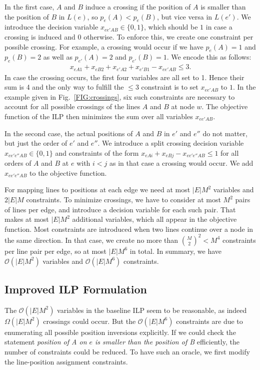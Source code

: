 \documentclass[sigconf]{acmart}
\begin{document}
In the first case, $A$ and $B$ induce a crossing if the position of $A$ is smaller than the position of $B$ in $L(e)$, so $p_e(A) < p_e(B)$, but vice versa in $L(e')$. We introduce the decision variable $x_{ee'AB} \in \{0,1\}$, which should be $1$ in case a crossing is induced and $0$ otherwise. To enforce this, we create one constraint per possible crossing. For example, a crossing would occur if we have $p_e(A)=1$ and $p_e(B)=2$ as well as $p_{e'}(A)=2$ and $p_{e'}(B) =1$. We encode this as follows:
\begin{align}
	x_{eA1} + x_{eB2} + x_{e'A2} + x_{e'B1} - x_{ee'AB} \leq 3  \label{EQ:crossdec_constr_bl}.
\end{align}
In case the crossing occurs, the first four variables are all set to 1. Hence their sum is 4 and the only way to fulfill the $\leq 3$ constraint is to set $x_{ee'AB}$ to $1$. In the example given in Fig.~\ref{FIG:crossings}, six such constraints are necessary to account for all possible crossings of the lines $A$ and $B$ at node $w$.
The objective function of the ILP then minimizes the sum over all variables $x_{ee'AB}$.

In the second case, the actual positions of $A$ and $B$ in $e'$ and $e''$ do not matter, but just the order of $e'$ and $e''$. We introduce a split crossing decision variable $x_{ee'e''AB} \in \{0,1\}$ and constraints of the form $x_{eAi} + x_{eBj} - x_{ee'e''AB} \leq 1$ for all orders of $A$ and $B$ at $e$ with $i < j$ as in that case a crossing would occur.
We add $x_{ee'e''AB}$ to the objective function.

For mapping lines to positions at each edge we need at most $|E|M^{2}$ variables and $2|E|M$ constraints. To minimize crossings, we have to consider at most $M^{2}$ pairs of lines per edge, and introduce a decision variable for each such pair. That makes at most $|E| M^{2}$ additional variables, which all appear in the objective function. Most constraints are introduced when two lines continue over a node in the same direction. In that case, we create no more than $\binom{M}{2}^{2} < M^{4}$ constraints per line pair per edge, so at most $|E| M^{6}$ in total.
In summary, we have $\mathcal{O}(|E|M^{2})$ variables and $\mathcal{O}(|E|M^{6})$ constraints.

%
\subsection{Improved ILP Formulation}\label{SEC:improved}
%
The $\mathcal{O}(|E|M^{2})$ variables in the baseline ILP seem to be reasonable, as indeed $\Omega(|E|M^{2})$ crossings could occur. But the $\mathcal{O}(|E|M^{6})$ constraints are due to enumerating all possible position inversions explicitly. If we could check the statement \emph{position of A on $e$ is smaller than the position of B} efficiently, the number of constraints could be reduced. To have such an oracle, we first modify the line-position assignment constraints.
\end{document}
